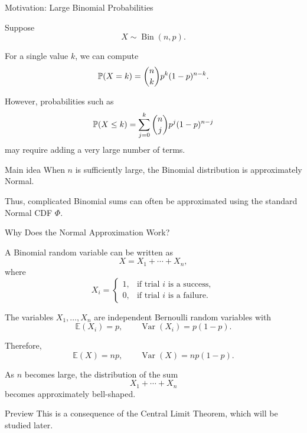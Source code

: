 


\begin{frame}{Motivation: Large Binomial Probabilities}

Suppose
\[
X\sim\operatorname{Bin}(n,p).
\]

For a single value \(k\), we can compute
\[
\mathbb{P}(X=k)
=
\binom{n}{k}p^k(1-p)^{n-k}.
\]

However, probabilities such as
\[
\mathbb{P}(X\leq k)
=
\sum_{j=0}^{k}
\binom{n}{j}p^j(1-p)^{n-j}
\]
may require adding a very large number of terms.

\vspace{0.25cm}

\begin{keybox}{Main idea}
When \(n\) is sufficiently large, the Binomial distribution is approximately
Normal.
\end{keybox}

Thus, complicated Binomial sums can often be approximated using the standard
Normal CDF \(\Phi\).

\end{frame}


\begin{frame}{Why Does the Normal Approximation Work?}

A Binomial random variable can be written as
\[
X=X_1+\cdots+X_n,
\]
where
\[
X_i=
\begin{cases}
1, & \text{if trial \(i\) is a success},\\
0, & \text{if trial \(i\) is a failure}.
\end{cases}
\]

The variables \(X_1,\ldots,X_n\) are independent Bernoulli random variables
with
\[
\mathbb{E}(X_i)=p,
\qquad
\operatorname{Var}(X_i)=p(1-p).
\]

Therefore,
\[
\mathbb{E}(X)=np,
\qquad
\operatorname{Var}(X)=np(1-p).
\]

\vspace{0.2cm}

As \(n\) becomes large, the distribution of the sum
\[
X_1+\cdots+X_n
\]
becomes approximately bell-shaped.

\begin{keybox}{Preview}
This is a consequence of the Central Limit Theorem, which will be studied
later.
\end{keybox}

\end{frame}


